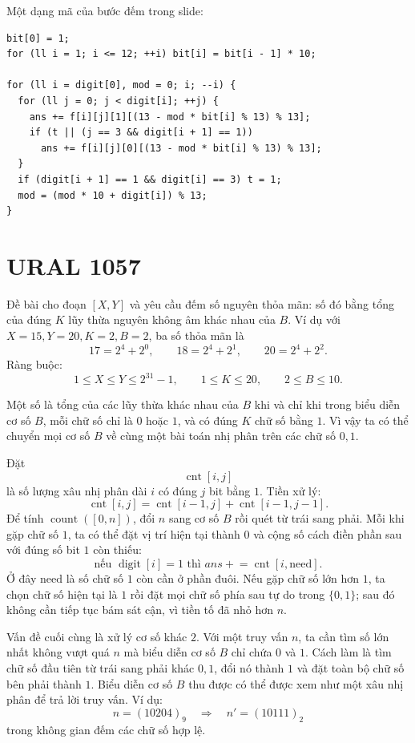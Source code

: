 \documentclass[11pt]{article}
\begin{document}
Một dạng mã của bước đếm trong slide:
\begin{verbatim}
bit[0] = 1;
for (ll i = 1; i <= 12; ++i) bit[i] = bit[i - 1] * 10;

for (ll i = digit[0], mod = 0; i; --i) {
  for (ll j = 0; j < digit[i]; ++j) {
    ans += f[i][j][1][(13 - mod * bit[i] % 13) % 13];
    if (t || (j == 3 && digit[i + 1] == 1))
      ans += f[i][j][0][(13 - mod * bit[i] % 13) % 13];
  }
  if (digit[i + 1] == 1 && digit[i] == 3) t = 1;
  mod = (mod * 10 + digit[i]) % 13;
}
\end{verbatim}

\section{URAL 1057}

Đề bài cho đoạn $[X,Y]$ và yêu cầu đếm số nguyên thỏa mãn: số đó bằng tổng của
đúng $K$ lũy thừa nguyên không âm khác nhau của $B$. Ví dụ với
$X=15,Y=20,K=2,B=2$, ba số thỏa mãn là
\[
  17=2^4+2^0,\qquad
  18=2^4+2^1,\qquad
  20=2^4+2^2.
\]
Ràng buộc:
\[
  1\le X\le Y\le 2^{31}-1,\qquad
  1\le K\le 20,\qquad
  2\le B\le 10.
\]

Một số là tổng của các lũy thừa khác nhau của $B$ khi và chỉ khi trong biểu
diễn cơ số $B$, mỗi chữ số chỉ là $0$ hoặc $1$, và có đúng $K$ chữ số bằng
$1$. Vì vậy ta có thể chuyển mọi cơ số $B$ về cùng một bài toán nhị phân trên
các chữ số $0,1$.

Đặt
\[
  \operatorname{cnt}[i,j]
\]
là số lượng xâu nhị phân dài $i$ có đúng $j$ bit bằng $1$. Tiền xử lý:
\[
  \operatorname{cnt}[i,j]
  =\operatorname{cnt}[i-1,j]+\operatorname{cnt}[i-1,j-1].
\]
Để tính $\operatorname{count}([0,n])$, đổi $n$ sang cơ số $B$ rồi quét từ trái
sang phải. Mỗi khi gặp chữ số $1$, ta có thể đặt vị trí hiện tại thành $0$ và
cộng số cách điền phần sau với đúng số bit $1$ còn thiếu:
\[
  \text{nếu }\operatorname{digit}[i]=1
  \text{ thì } ans\mathrel{+}=\operatorname{cnt}[i,\mathrm{need}].
\]
Ở đây $\mathrm{need}$ là số chữ số $1$ còn cần ở phần đuôi. Nếu gặp chữ số lớn
hơn $1$, ta chọn chữ số hiện tại là $1$ rồi đặt mọi chữ số phía sau tự do
trong $\{0,1\}$; sau đó không cần tiếp tục bám sát cận, vì tiền tố đã nhỏ hơn
$n$.

Vấn đề cuối cùng là xử lý cơ số khác $2$. Với một truy vấn $n$, ta cần tìm số
lớn nhất không vượt quá $n$ mà biểu diễn cơ số $B$ chỉ chứa $0$ và $1$. Cách
làm là tìm chữ số đầu tiên từ trái sang phải khác $0,1$, đổi nó thành $1$ và
đặt toàn bộ chữ số bên phải thành $1$. Biểu diễn cơ số $B$ thu được có thể
được xem như một xâu nhị phân để trả lời truy vấn. Ví dụ:
\[
  n=(10204)_9 \quad\Longrightarrow\quad n'=(10111)_2
\]
trong không gian đếm các chữ số hợp lệ.
\end{document}
